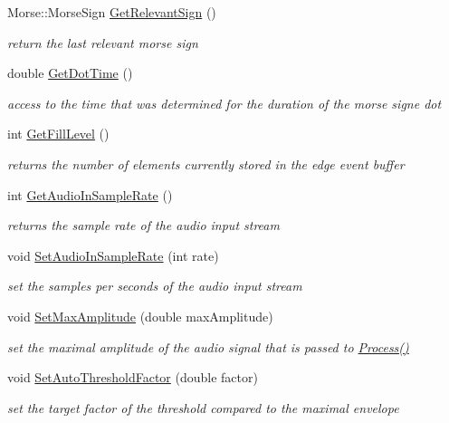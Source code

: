 \begin{DoxyCompactItemize}
Morse\+::\+Morse\+Sign \hyperlink{classMorseDecode_a6986b35715ebadf7a1264e1667c0e253}{Get\+Relevant\+Sign} ()
\begin{DoxyCompactList}\small\item\em return the last relevant morse sign \end{DoxyCompactList}\item 
double \hyperlink{classMorseDecode_a377a7a2c31260c045d472adc96662b85}{Get\+Dot\+Time} ()
\begin{DoxyCompactList}\small\item\em access to the time that was determined for the duration of the morse signe dot \end{DoxyCompactList}\item 
int \hyperlink{classMorseDecode_a716a68423027190d97a59f74aba2f8b3}{Get\+Fill\+Level} ()
\begin{DoxyCompactList}\small\item\em returns the number of elements currently stored in the edge event buffer \end{DoxyCompactList}\item 
int \hyperlink{classMorseDecode_a2827ff2cfbdf56c76154c1d471a0aca5}{Get\+Audio\+In\+Sample\+Rate} ()
\begin{DoxyCompactList}\small\item\em returns the sample rate of the audio input stream \end{DoxyCompactList}\item 
void \hyperlink{classMorseDecode_a34df828f9599e4185b2b0f2999e355b2}{Set\+Audio\+In\+Sample\+Rate} (int rate)
\begin{DoxyCompactList}\small\item\em set the samples per seconds of the audio input stream \end{DoxyCompactList}\item 
void \hyperlink{classMorseDecode_a1b09ba48ee9ae8c7de75e2b4dbb0fdab}{Set\+Max\+Amplitude} (double max\+Amplitude)
\begin{DoxyCompactList}\small\item\em set the maximal amplitude of the audio signal that is passed to \hyperlink{classMorseDecode_a9db5d2a826a6795f8a18cf123604d5a9}{Process()} \end{DoxyCompactList}\item 
void \hyperlink{classMorseDecode_a71b04d87d48e3eb062068bda7fda6ea9}{Set\+Auto\+Threshold\+Factor} (double factor)
\begin{DoxyCompactList}\small\item\em set the target factor of the threshold compared to the maximal envelope \end{DoxyCompactList}\item 

\end{DoxyCompactItemize}
